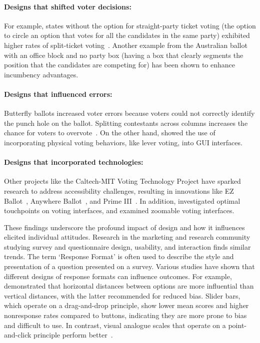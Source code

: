 \paragraph{Designs that shifted voter decisions: } For example, states without the option for straight-party ticket voting (the option to circle an option that votes for all the candidates in the same party) exhibited higher rates of split-ticket voting~\cite{engstrom2020politics}. Another example from the Australian ballot with an office block and no party box (having a box that clearly segments the position that the candidates are competing for) has been shown to enhance incumbency advantages.
\paragraph{Designs that influenced errors: } Butterfly ballots increased voter errors because voters could not correctly identify the punch hole on the ballot. Splitting contestants across columns increases the chance for voters to overvote~\cite{quesenberyOpinionGoodDesign2020}. On the other hand, \textcite{everettElectronicVotingMachines2008} showed the use of incorporating physical voting behaviors, like lever voting, into GUI interfaces.
\paragraph{Designs that incorporated technologies: } Other projects like the Caltech-MIT Voting Technology Project have sparked research to address accessibility challenges, resulting in innovations like EZ Ballot~\cite{leeUniversalDesignBallot2016}, Anywhere Ballot~\cite{summers2014making}, and Prime III~\cite{dawkinsPrimeIIIInnovative2009}. In addition, \textcite{gilbertAnomalyDetectionElectronic2013} investigated optimal touchpoints on voting interfaces, and \textcite{conradElectronicVotingEliminates2009} examined zoomable voting interfaces.

These findings underscore the profound impact of design and how it influences elicited individual attitudes. Research in the marketing and research community studying survey and questionnaire design, usability, and interaction finds similar trends. The term `Response Format' is often used to describe the style and presentation of a question presented on a survey. Various studies have shown that different designs of response formats can influence outcomes. For example, \textcite{weijtersExtremityHorizontalVertical2021} demonstrated that horizontal distances between options are more influential than vertical distances, with the latter recommended for reduced bias. Slider bars, which operate on a drag-and-drop principle, show lower mean scores and higher nonresponse rates compared to buttons, indicating they are more prone to bias and difficult to use. In contrast, visual analogue scales that operate on a point-and-click principle perform better~\cite{toepoelSlidersVisualAnalogue2018}. 


